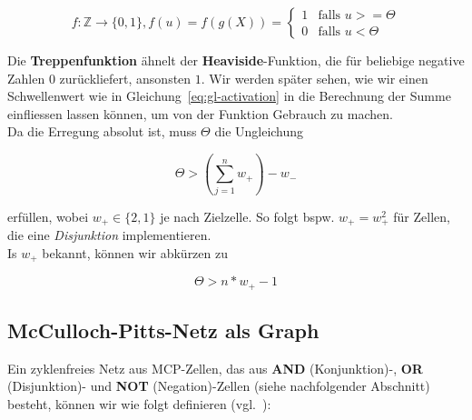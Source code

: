 \begin{equation}
f:  \mathbb{Z} \to \{0, 1\}, f(u) = f(g(X)) = \begin{cases}
                                          1  &\text{falls } u >= \Theta \\
                                          0 &\text{falls } u < \Theta
\end{cases}
\label{eq:gl-activation}
\end{equation}\linebreak[2]


\noindent
Die \textbf{Treppenfunktion} ähnelt der \textbf{Heaviside}-Funktion, die für beliebige negative Zahlen $0$ zurückliefert, ansonsten $1$.
Wir werden später sehen, wie wir einen Schwellenwert wie in Gleichung~\ref{eq:gl-activation} in die Berechnung der Summe einfliessen lassen können, um von der Funktion Gebrauch zu machen.\\

\noindent
Da die Erregung absolut ist, muss $\Theta$ die Ungleichung

\begin{equation}
\Theta > (\sum^n_{j=1} w_+) - w_-
\end{equation}\linebreak[2]

\noindent
erfüllen, wobei $w_+ \in \{2, 1\}$ je nach Zielzelle. So folgt bspw. $w_+ = w^2_+$ für Zellen, die eine \textit{Disjunktion} implementieren.\\

\noindent
Is $w_+$ bekannt, können wir abkürzen zu

\begin{equation}
\Theta > n * w_+ - 1
\end{equation}


\subsection{McCulloch-Pitts-Netz als Graph}

Ein zyklenfreies Netz aus MCP-Zellen, das aus \textbf{AND} (Konjunktion)-, \textbf{OR} (Disjunktion)- und \textbf{NOT} (Negation)-Zellen (siehe nachfolgender Abschnitt) besteht, können wir wie folgt definieren (vgl.~\cite[32 ``Definition 2.1``]{Roj93}):


